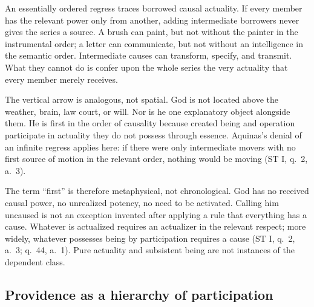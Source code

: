 An essentially ordered regress traces borrowed causal actuality. If every member has the relevant power only from another, adding intermediate borrowers never gives the series a source. A brush can paint, but not without the painter in the instrumental order; a letter can communicate, but not without an intelligence in the semantic order. Intermediate causes can transform, specify, and transmit. What they cannot do is confer upon the whole series the very actuality that every member merely receives.

\begin{center}
\end{center}

The vertical arrow is analogous, not spatial. God is not located above the weather, brain, law court, or will. Nor is he one explanatory object alongside them. He is first in the order of causality because created being and operation participate in actuality they do not possess through essence. Aquinas's denial of an infinite regress applies here: if there were only intermediate movers with no first source of motion in the relevant order, nothing would be moving (ST I, q.~2, a.~3).

The term ``first'' is therefore metaphysical, not chronological. God has no received causal power, no unrealized potency, no need to be activated. Calling him uncaused is not an exception invented after applying a rule that everything has a cause. Whatever is actualized requires an actualizer in the relevant respect; more widely, whatever possesses being by participation requires a cause (ST I, q.~2, a.~3; q.~44, a.~1). Pure actuality and subsistent being are not instances of the dependent class.

\subsection{Providence as a hierarchy of participation}

